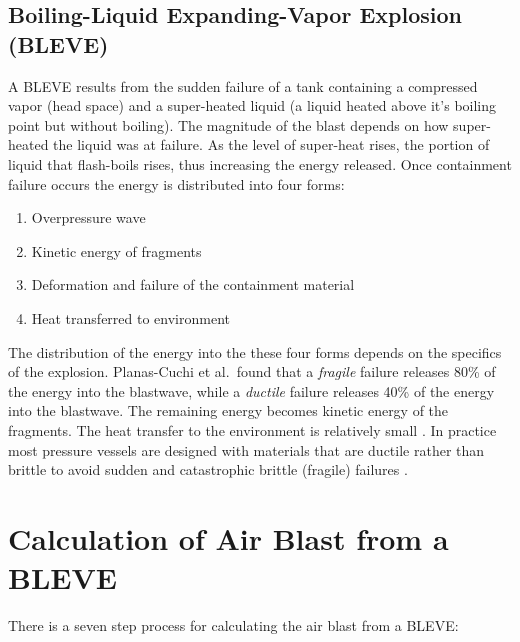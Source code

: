 \documentclass[10pt,parskip=half,
toc=sectionentrywithdots,
bibliography=totocnumbered,
captions=tableheading,numbers=noendperiod]{scrartcl}
\providecommand{\tightlist}{%
  \setlength{\itemsep}{0pt}\setlength{\parskip}{0pt}}
\begin{document}
\hypertarget{boiling-liquid-expanding-vapor-explosion-bleve}{%
\subsection{Boiling-Liquid Expanding-Vapor Explosion
(BLEVE)}\label{boiling-liquid-expanding-vapor-explosion-bleve}}

A BLEVE results from the sudden failure of a tank containing a
compressed vapor (head space) and a super-heated liquid (a liquid heated
above it's boiling point but without boiling). The magnitude of the
blast depends on how super-heated the liquid was at failure. As the
level of super-heat rises, the portion of liquid that flash-boils rises,
thus increasing the energy released. Once containment failure occurs the
energy is distributed into four forms:

\begin{enumerate}
\def\labelenumi{\arabic{enumi}.}
\tightlist
\item
  Overpressure wave
\item
  Kinetic energy of fragments
\item
  Deformation and failure of the containment material
\item
  Heat transferred to environment
\end{enumerate}

The distribution of the energy into the these four forms depends on the
specifics of the explosion. Planas-Cuchi et al.~found that a
\emph{fragile} failure releases 80\% of the energy into the blastwave,
while a \emph{ductile} failure releases 40\% of the energy into the
blastwave. The remaining energy becomes kinetic energy of the fragments.
The heat transfer to the environment is relatively small
\cite{Planas2004}. In practice most pressure vessels are designed with
materials that are ductile rather than brittle to avoid sudden and
catastrophic brittle (fragile) failures \cite{Benac2016}.

\hypertarget{calculation-of-air-blast-from-a-bleve}{%
\section{Calculation of Air Blast from a
BLEVE}\label{calculation-of-air-blast-from-a-bleve}}

There is a seven step process for calculating the air blast from a
BLEVE:
\end{document}
